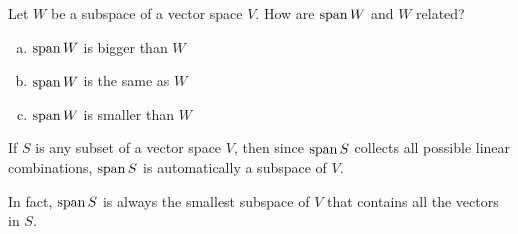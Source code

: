 \begin{applicationActivities}
\begin{activity}{5}
Let \(W\) be a subspace of a vector space \(V\).  How are \(\operatorname{span} W\) and \(W\) related?
\begin{enumerate}[(a)]
\item \(\operatorname{span} W\) is bigger than \(W\)
\item \(\operatorname{span} W\) is the same as \(W\)
\item \(\operatorname{span} W\) is smaller than \(W\)
\end{enumerate}
\end{activity}

\begin{fact}
  If \(S\) is any subset of a vector space \(V\), then
  since \(\operatorname{span} S\) collects all possible linear combinations,
  \(\operatorname{span} S\) is automatically a subspace of \(V\).

  \vspace{1em}

  In fact, \(\operatorname{span} S\) is always the smallest
  subspace of \(V\) that contains all the vectors in \(S\).
\end{fact}

\end{applicationActivities}
